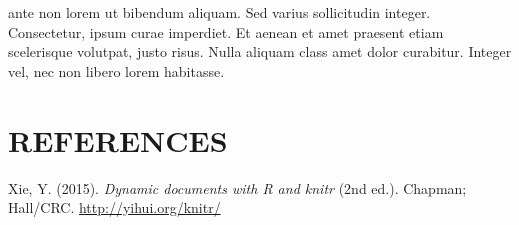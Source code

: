 \documentclass{source/tex/templates/maththesis}
\newlength{\cslhangindent}
\newenvironment{CSLReferences}[2] %
 {%
  \setlength{\parindent}{0pt}
  \ifodd #1
  \let\oldpar\par
  \def\par{\hangindent=\cslhangindent\oldpar}
  \fi
  \setlength{\parskip}{1mm}
  \setlength{\baselineskip}{6mm}
 }%
 {}
\begin{document}
ante non lorem ut bibendum aliquam. Sed varius sollicitudin integer. Consectetur, ipsum curae imperdiet. Et aenean et amet praesent etiam scelerisque volutpat, justo risus. Nulla aliquam class amet dolor curabitur. Integer vel, nec non libero lorem habitasse.

\hypertarget{references}{%
\chapter*{REFERENCES}\label{references}}

\hypertarget{refs}{}
\begin{CSLReferences}{1}{0}
\leavevmode{}%
Xie, Y. (2015). \emph{Dynamic documents with {R} and knitr} (2nd ed.). Chapman; Hall/CRC. \url{http://yihui.org/knitr/}

\end{CSLReferences}

\end{document}

